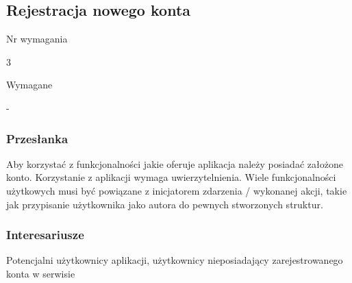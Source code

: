 \documentclass[eng,printmode]{mgr}
\begin{document}
\subsection{Rejestracja nowego konta}
\begin{labeling}{Nr wymagania}
\item [Nr wymagania:] 3
\item [Priorytet:] Wymagane
\item [Powiązania:] -
\end{labeling}

\subsubsection{Przesłanka}
Aby korzystać z funkcjonalności jakie oferuje aplikacja należy posiadać założone konto. Korzystanie z aplikacji wymaga uwierzytelnienia. Wiele funkcjonalności użytkowych musi być powiązane z inicjatorem zdarzenia / wykonanej akcji, takie jak przypisanie użytkownika jako autora do pewnych stworzonych struktur.

\subsubsection{Interesariusze}
Potencjalni użytkownicy aplikacji, użytkownicy nieposiadający zarejestrowanego konta w serwisie
\end{document}
